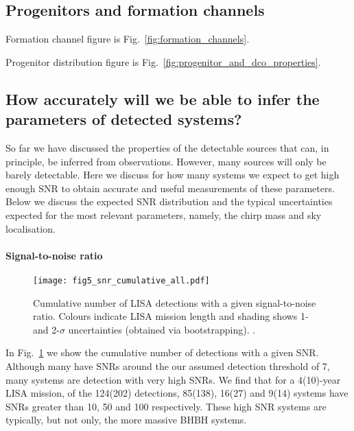 \subsection{Progenitors and formation channels}\label{sec:progenitors_and_formation}

Formation channel figure is Fig.~\ref{fig:formation_channels}.

Progenitor distribution figure is Fig.~\ref{fig:progenitor_and_dco_properties}.


\subsection{How accurately will we be able to infer the parameters of detected systems?}\label{sec:measurement_uncertainties}
So far we have discussed the properties of the detectable sources that can, in principle, be inferred from observations. However, many sources will only be barely detectable. Here we discuss for how many systems we expect to get high enough SNR to obtain accurate and useful measurements of these parameters. Below we discuss the expected SNR distribution and the typical uncertainties expected for the most relevant parameters, namely, the chirp mass and sky localisation.

\paragraph{Signal-to-noise ratio}

\begin{figure}[tb]
    \centering
    \texttt{[image: fig5\_snr\_cumulative\_all.pdf]}
    \caption{Cumulative number of LISA detections with a given signal-to-noise ratio. Colours indicate LISA mission length and shading shows 1- and 2-$\sigma$ uncertainties (obtained via bootstrapping). \href{https://github.com/TomWagg/detecting-DCOs-in-LISA/blob/main/paper/figures/fig5_snr_cumulative_all.pdf}{\faFileImage} \href{https://github.com/TomWagg/detecting-DCOs-in-LISA/blob/main/paper/figure_notebooks/fiducial.ipynb}{\faBook}.}
    \label{fig:snr_dist}
\end{figure}

In Fig.~\ref{fig:snr_dist} we show the cumulative number of detections with a given SNR. Although many have SNRs around the our assumed detection threshold of 7, many systems are detection with very high SNRs. We find that for a 4(10)-year LISA mission, of the 124(202) detections, 85(138), 16(27) and 9(14) systems have SNRs greater than 10, 50 and 100 respectively. These high SNR systems are typically, but not only, the more massive BHBH systems.

